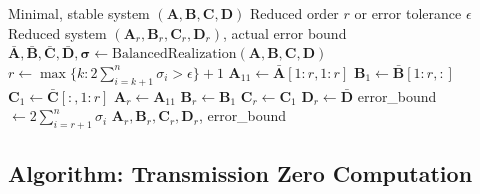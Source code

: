 \begin{algorithm}[H]
\caption{Model Reduction via Balanced Truncation}
\label{alg:balanced_truncation}
\begin{algorithmic}[1]
\REQUIRE Minimal, stable system $(\mathbf{A}, \mathbf{B}, \mathbf{C}, \mathbf{D})$
\REQUIRE Reduced order $r$ or error tolerance $\epsilon$
\ENSURE Reduced system $(\mathbf{A}_r, \mathbf{B}_r, \mathbf{C}_r, \mathbf{D}_r)$, actual error bound
\STATE
{}
\STATE $\bar{\mathbf{A}}, \bar{\mathbf{B}}, \bar{\mathbf{C}}, \bar{\mathbf{D}}, \boldsymbol{\sigma} \gets \text{BalancedRealization}(\mathbf{A}, \mathbf{B}, \mathbf{C}, \mathbf{D})$
\STATE
{}
    \STATE $r \gets \max\{k : 2\sum_{i=k+1}^n \sigma_i > \epsilon\} + 1$ 
\ENDIF
\STATE
{}
\STATE $\mathbf{A}_{11} \gets \bar{\mathbf{A}}[1{:}r, 1{:}r]$
\STATE $\mathbf{B}_1 \gets \bar{\mathbf{B}}[1{:}r, :]$
\STATE $\mathbf{C}_1 \gets \bar{\mathbf{C}}[:, 1{:}r]$
\STATE
{}
\STATE $\mathbf{A}_r \gets \mathbf{A}_{11}$
\STATE $\mathbf{B}_r \gets \mathbf{B}_1$
\STATE $\mathbf{C}_r \gets \mathbf{C}_1$
\STATE $\mathbf{D}_r \gets \bar{\mathbf{D}}$
\STATE
{}
\STATE error\_bound $\gets 2 \sum_{i=r+1}^n \sigma_i$
\STATE
\RETURN $\mathbf{A}_r, \mathbf{B}_r, \mathbf{C}_r, \mathbf{D}_r$, error\_bound
\end{algorithmic}
\end{algorithm}


\subsection{Algorithm: Transmission Zero Computation}

